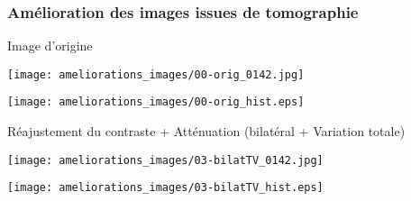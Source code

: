 \documentclass[8pt]{beamer}
\begin{document}
\begin{frame}
	\frametitle{Amélioration des images issues de tomographie}
	\vfill
	\begin{block}{Image d'origine}
		\begin{minipage}[c]{.29\textwidth}\centering
			\texttt{[image: ameliorations\_images/00-orig\_0142.jpg]}
		\end{minipage}
		\begin{minipage}[c]{.69\textwidth}\centering
			\texttt{[image: ameliorations\_images/00-orig\_hist.eps]}
		\end{minipage}
	\end{block}
	\vfill
	\begin{block}{Réajustement du contraste + Atténuation (bilatéral + Variation totale)}
		\begin{minipage}[c]{.29\textwidth}\centering
			\texttt{[image: ameliorations\_images/03-bilatTV\_0142.jpg]}
		\end{minipage}
		\begin{minipage}[c]{.69\textwidth}\centering
			\texttt{[image: ameliorations\_images/03-bilatTV\_hist.eps]}
		\end{minipage}
	\end{block}\vfill
\end{frame}
\end{document}
